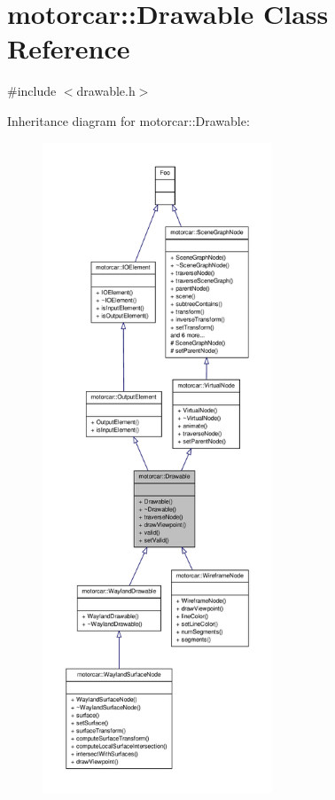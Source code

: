 \hypertarget{classmotorcar_1_1Drawable}{\section{motorcar\-:\-:Drawable Class Reference}
\label{classmotorcar_1_1Drawable}
}


{\ttfamily \#include $<$drawable.\-h$>$}



Inheritance diagram for motorcar\-:\-:Drawable\-:
\nopagebreak
\begin{figure}[H]
\begin{center}
\leavevmode
\includegraphics[height=550pt]{classmotorcar_1_1Drawable__inherit__graph}
\end{center}
\end{figure}


